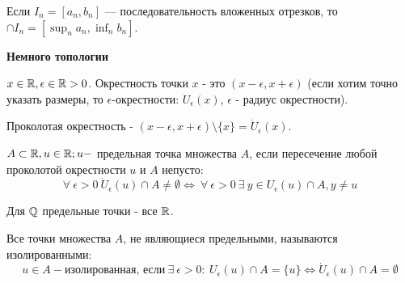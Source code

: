 \documentclass[12pt]{report}
\begin{document}
\begin{cor}
Если $I_n = [a_n, b_n]$ --- последовательность вложенных отрезков, то $\cap I_n = [\sup_n{a_n}, \inf_n{b_n}]$. 
\end{cor}

\begin{center}
{\bfseries Немного топологии}
\end{center}

\begin{defn}[Окрестности]
$x \in \mathbb{R}, \epsilon \in \mathbb{R} > 0$. Окрестность точки $x$ - это $(x - \epsilon, x + \epsilon)$ (если хотим точно указать размеры, то $\epsilon$-окрестности: $U_\epsilon(x)$, $\epsilon$ - радиус окрестности).
\end{defn}

\begin{defn}
Проколотая окрестность - $(x - \epsilon, x + \epsilon)\setminus \{x\} = \dot U_\epsilon(x)$.
\end{defn}

\begin{defn}
$A \subset \mathbb{R}, u \in \mathbb{R}; u - $ предельная точка множества $A$, если пересечение любой проколотой окрестности $u$ и $A$ непусто:
$$\forall ~\epsilon > 0 ~\dot U_\epsilon(u) \cap A \neq \emptyset \Leftrightarrow ~\forall ~\epsilon > 0 ~\exists ~y \in U_\epsilon(u) \cap A, y \neq u$$
\end{defn}

\begin{ex}
Для $\mathbb{Q}$ предельные точки - все $\mathbb{R}$.
\end{ex}

\begin{defn}
Все точки множества $A$, не являющиеся предельными, называются изолированными:
$$u \in A - \mbox{изолированная, если} ~\exists ~\epsilon > 0 : ~U_\epsilon (u) \cap A = \{u\} \Leftrightarrow \dot U_\epsilon (u) \cap A = \emptyset$$
\end{defn}
\end{document}
